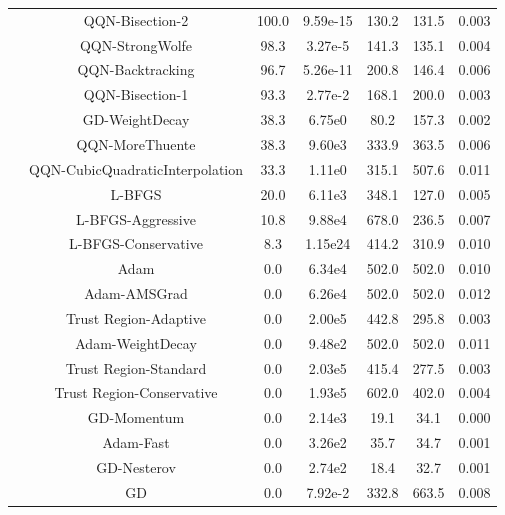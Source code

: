 \documentclass{article}
\begin{document}
\begin{table}[htbp]
{\begin{tabular}{l*{6}{S[table-format=2.2e-1]}}
 & QQN-Bisection-2 & 100.0 & 9.59e-15 & 130.2 & 131.5 & 0.003 \\
 & QQN-StrongWolfe & 98.3 & 3.27e-5 & 141.3 & 135.1 & 0.004 \\
 & QQN-Backtracking & 96.7 & 5.26e-11 & 200.8 & 146.4 & 0.006 \\
 & QQN-Bisection-1 & 93.3 & 2.77e-2 & 168.1 & 200.0 & 0.003 \\
 & GD-WeightDecay & 38.3 & 6.75e0 & 80.2 & 157.3 & 0.002 \\
 & QQN-MoreThuente & 38.3 & 9.60e3 & 333.9 & 363.5 & 0.006 \\
 & QQN-CubicQuadraticInterpolation & 33.3 & 1.11e0 & 315.1 & 507.6 & 0.011 \\
 & L-BFGS & 20.0 & 6.11e3 & 348.1 & 127.0 & 0.005 \\
 & L-BFGS-Aggressive & 10.8 & 9.88e4 & 678.0 & 236.5 & 0.007 \\
 & L-BFGS-Conservative & 8.3 & 1.15e24 & 414.2 & 310.9 & 0.010 \\
 & Adam & 0.0 & 6.34e4 & 502.0 & 502.0 & 0.010 \\
 & Adam-AMSGrad & 0.0 & 6.26e4 & 502.0 & 502.0 & 0.012 \\
 & Trust Region-Adaptive & 0.0 & 2.00e5 & 442.8 & 295.8 & 0.003 \\
 & Adam-WeightDecay & 0.0 & 9.48e2 & 502.0 & 502.0 & 0.011 \\
 & Trust Region-Standard & 0.0 & 2.03e5 & 415.4 & 277.5 & 0.003 \\
 & Trust Region-Conservative & 0.0 & 1.93e5 & 602.0 & 402.0 & 0.004 \\
 & GD-Momentum & 0.0 & 2.14e3 & 19.1 & 34.1 & 0.000 \\
 & Adam-Fast & 0.0 & 3.26e2 & 35.7 & 34.7 & 0.001 \\
 & GD-Nesterov & 0.0 & 2.74e2 & 18.4 & 32.7 & 0.001 \\
 & GD & 0.0 & 7.92e-2 & 332.8 & 663.5 & 0.008 \\
\midrule
\bottomrule
\end{tabular}
}
\end{table}
\end{document}
